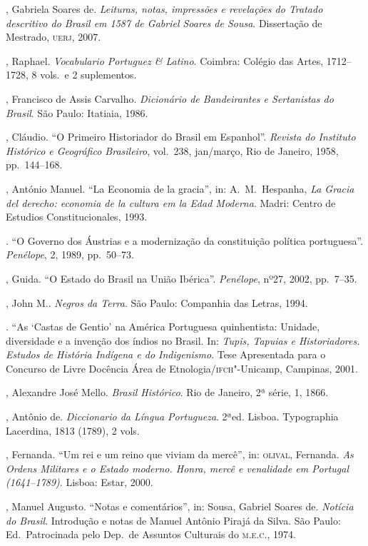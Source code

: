\begin{bibliohedra}

, Gabriela Soares de. \textit{Leituras, notas, impressões e revelações do 
Tratado descritivo do Brasil em 1587 de Gabriel Soares de Sousa}. Dissertação de Mestrado, \textsc{uerj}, 2007.

, Raphael. \textit{Vocabulario Portuguez \& Latino}. Coimbra: Colégio das Artes, 1712--1728, 8 vols.~e 2 suplementos.

, Francisco de Assis Carvalho. \textit{Dicionário de Bandeirantes e Sertanistas do Brasil}. São Paulo: Itatiaia, 1986.

, Cláudio. “O Primeiro Historiador do Brasil em Espanhol”. 
\textit{Revista do Instituto Histórico e Geográfico Brasileiro}, vol.~238, jan/março, Rio de Janeiro, 1958, pp.~144--168.

, António Manuel. “La Economia de la gracia”, in: A.~M.~Hespanha, 
\textit{La Gracia del derecho: economia de la cultura em la Edad Moderna}. Madri: Centro de Estudios Constitucionales, 1993.

\titidem. “O Governo dos Áustrias e a modernização da 
constituição política portuguesa”. \textit{Penélope}, 2, 1989, pp.~50--73.

, Guida. “O Estado do Brasil na União Ibérica”. \textit{Penélope}, nº27, 2002, pp.~7--35.

, John M.. \textit{Negros da Terra}. São Paulo: Companhia das Letras, 1994.

\titidem. “As ‘Castas de Gentio’ na América Portuguesa quinhentista: Unidade, 
diversidade e a invenção dos índios no Brasil. In: \textit{Tupis, Tapuias e Historiadores. 
Estudos de História Indígena e do Indigenismo}. Tese Apresentada para o Concurso de Livre Docência Área de Etnologia/\textsc{ifch}"-Unicamp, Campinas, 2001.

, Alexandre José Mello. \textit{Brasil Histórico}. Rio de Janeiro, 2ª série, 1, 1866.

, Antônio de. \textit{Diccionario da Língua Portugueza}. 2ªed. Lisboa. Typographia Lacerdina, 1813 (1789), 2 vols.

, Fernanda. “Um rei e um reino que viviam da mercê”, in: \textsc{olival}, Fernanda. 
\textit{As Ordens Militares e o Estado moderno. Honra, mercê e venalidade em Portugal (1641--1789)}. Lisboa: Estar, 2000.

, Manuel Augusto. “Notas e comentários”, in: Sousa, Gabriel Soares de.
\textit{Notícia do Brasil}. Introdução e notas de Manuel Antônio Pirajá da Silva. São Paulo: 
Ed.~Patrocinada pelo Dep.~de Assuntos Culturais do \textsc{m.e.c.}, 1974.


\end{bibliohedra}
